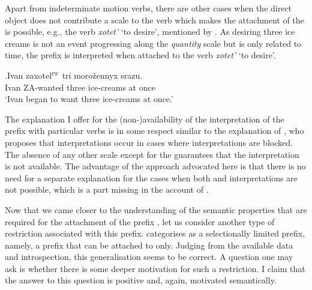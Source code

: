 Apart from indeterminate motion verbs, there are other cases when the direct object does not contribute a scale to the verb which makes the attachment of the   is possible, e.g., the verb \textit{xotet'} `to desire', mentioned by \citet{Braginsky:08}. As desiring three ice creams is not an event progressing along the \textit{quantity} scale but is only related to time, the prefix  is interpreted  when attached to the verb \textit{xotet'} `to desire'.

\exg.\label{ex:zaxotet}Ivan zaxotel$^{\textsc{pf}}$ tri moro\v{z}ennyx srazu.\\
Ivan ZA-wanted three ice-creams {at once}\\
\trans `Ivan began to want three ice-creams at once.'
\\

The explanation I offer for the (non-)availability of the  interpretation of the prefix  with particular verbs is in some respect similar to the explanation of \citet{Braginsky:08}, who proposes that  interpretations occur in cases where  interpretations are blocked. The absence of any other scale except for the  guarantees that the  interpretation is not available. The advantage of the approach advocated here is that there is no need for a separate explanation for the cases when both  and  interpretations are not possible, which is a part missing in the account of \citet{Braginsky:08}.

Now that we came closer to the understanding of the semantic properties that are required for the attachment of the  prefix , let us consider another type of restriction associated with this prefix. \citet{Tatevosov:09} categorises  as a selectionally limited prefix, namely, a prefix that can be attached to  only. Judging from the available data and introspection, this generalisation seems to be correct. A question one may ask is whether there is some deeper motivation for such a restriction. I claim that the answer to this question is positive and, again, motivated semantically.\largerpage[-1]

